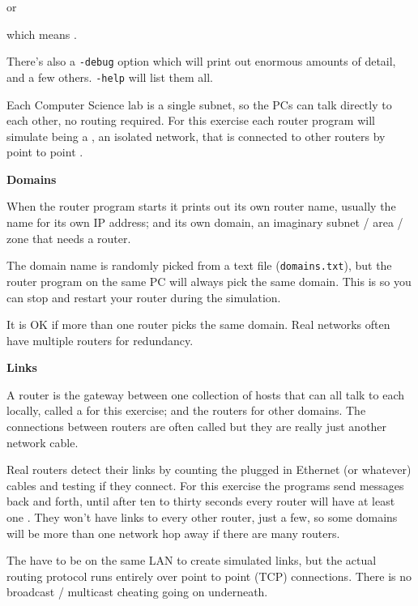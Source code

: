 or

which means .

There's also a \texttt{-debug} option which will print out
enormous amounts of detail, and a few others. \texttt{-help}
will list them all.



Each Computer Science lab is a single subnet, so the PCs
can talk directly to each other, no routing required.
For this exercise each router program will simulate being a
, an isolated network, that is connected to
other routers by point to point .

\textbf{Domains}

When the router program starts it prints out its own
router name, usually the name for its own IP address;
and its own domain, an imaginary
subnet / area / zone that needs a router.

The domain name is randomly picked from a text file
(\texttt{domains.txt}), but the router program on the same
PC will always pick the same domain. This is so you can stop
and restart your router during the simulation.

It is OK if more than one router picks the same domain.
Real networks often have multiple routers for redundancy.

\textbf{Links}

A router is the gateway between one collection of hosts that
can all talk to each locally, called a  for this
exercise; and the routers for other domains. The connections
between routers are often called  but they are
really just another network cable.

Real routers detect their links by counting the plugged in
Ethernet (or whatever) cables and testing if they connect.
For this exercise the programs send messages back and forth,
until after ten to thirty seconds every router will have at
least one . They won't have links to every other router,
just a few, so some domains will be more than one network
hop away if there are many routers.

\begin{IMPORTANT}
The  have to be on the same LAN to create simulated
links, but the actual routing protocol runs entirely over point
to point (TCP) connections. There is no broadcast / multicast
cheating going on underneath.
\end{IMPORTANT}


